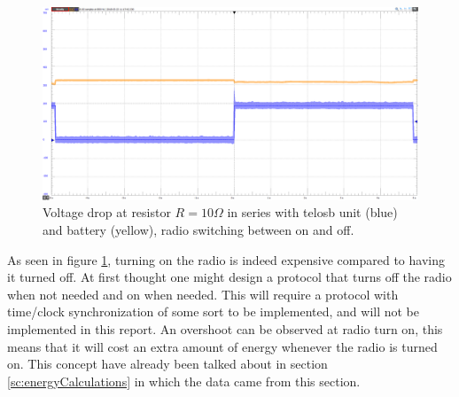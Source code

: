 \begin{figure}[H]
	\centering
	\includegraphics[width=\linewidth]{implementation/energylab/fig/radioSwitching.png}
	\caption{Voltage drop at resistor $R=10\Omega$ in series with telosb unit (blue) and battery (yellow), radio switching between on and off.}
	\label{fig:radioSwitching}
\end{figure}

\noindent As seen in figure \ref{fig:radioSwitching}, turning on the radio is indeed expensive compared to having it turned off. At first thought one might design a protocol that turns off the radio when not needed and on when needed. This will require a protocol with time/clock synchronization of some sort to be implemented, and will not be implemented in this report. An overshoot can be observed at radio turn on, this means that it will cost an extra amount of energy whenever the radio is turned on. This concept have already been talked about in section \ref{sc:energyCalculations} in which the data came from this section.